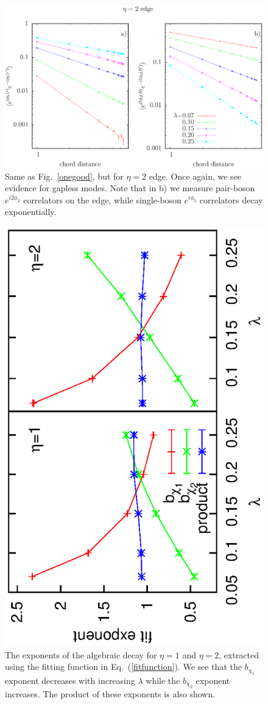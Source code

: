 \begin{figure}
\includegraphics[width=\linewidth]{figures/twocord.eps}
\caption{ Same as Fig.~\ref{onegood}, but for $\eta=2$ edge. Once again, we see evidence for gapless modes. Note that in b) we measure pair-boson $e^{i 2\phi_2}$ correlators on the edge, while single-boson $e^{i\phi_2}$ correlators decay exponentially.
\label{twogood}}
\end{figure}

\begin{figure}
\includegraphics[width=0.6\linewidth,angle=-90]{figures/exp1.eps}
\caption{ The exponents of the algebraic decay for $\eta=1$ and $\eta=2$, extracted using the fitting function in Eq.~(\ref{fitfunction}). We see that the $b_{\chi_1}$ exponent decreases with increasing $\lambda$ while the $b_{\chi_2}$ exponent increases. The product of these exponents is also shown.
\label{exponents}}
\end{figure}

